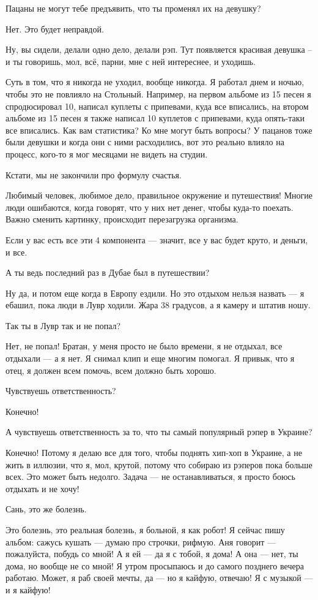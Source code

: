 Пацаны не могут тебе предъявить, что ты променял их на девушку?

Нет. Это будет неправдой.

Ну, вы сидели, делали одно дело, делали рэп. Тут появляется красивая девушка –
и ты говоришь, мол, всё, парни, мне с ней интереснее, и уходишь.

Суть в том, что я никогда не уходил, вообще никогда. Я работал днем и ночью,
чтобы это не повлияло на Стольный. Например, на первом альбоме из 15 песен я
спродюсировал 10, написал куплеты с припевами, куда все вписались, на втором
альбоме из 15 песен я также написал 10 куплетов с припевами, куда опять-таки
все вписались. Как вам статистика? Ко мне могут быть вопросы? У пацанов тоже
были девушки и когда они с ними расходились, вот это реально влияло на процесс,
кого-то я мог месяцами не видеть на студии.

Кстати, мы не закончили про формулу счастья.

Любимый человек, любимое дело, правильное окружение и путешествия! Многие люди
ошибаются, когда говорят, что у них нет денег, чтобы куда-то поехать. Важно
сменить картинку, происходит перезагрузка организма.

Если у вас есть все эти 4 компонента --- значит, все у вас будет круто, и деньги,
и все.

А ты ведь последний раз в Дубае был в путешествии?

Ну да, и потом еще когда в Европу ездили. Но это отдыхом нельзя назвать --- я
ебашил, пока люди в Лувр ходили.  Жара 38 градусов, а я камеру и штатив ношу.

Так ты в Лувр так и не попал?

Нет, не попал! Братан, у меня просто не было времени, я не отдыхал, все
отдыхали ---  а я нет. Я снимал клип и еще многим помогал. Я привык, что я отец,
я должен всем помочь, всем должно быть хорошо.

Чувствуешь ответственность?

Конечно!

А чувствуешь ответственность за то, что ты самый популярный рэпер в Украине?

Конечно! Потому я делаю все для того, чтобы поднять хип-хоп в Украине, а не
жить в иллюзии, что я, мол, крутой, потому что собираю из рэперов пока больше
всех. Это может быть недолго. Задача --- не останавливаться, я просто боюсь
отдыхать и не хочу!

Сань, это же болезнь.

Это болезнь, это реальная болезнь, я больной, я как робот! Я сейчас пишу
альбом: сажусь кушать --- думаю про строчки, рифмую. Аня говорит --- пожалуйста,
побудь со мной! А я ей --- да я с тобой, я дома! А она --- нет, ты дома, но вообще
не со мной! Я утром просыпаюсь и до самого позднего вечера работаю. Может, я
раб своей мечты, да --- но я кайфую, отвечаю! Я с музыкой --- и я кайфую!


